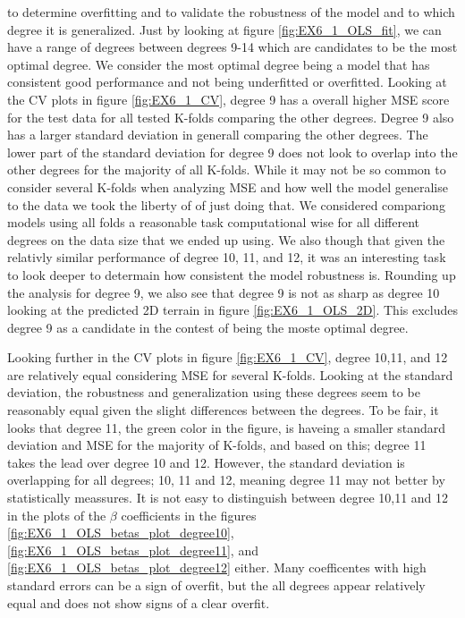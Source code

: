 \documentclass[11pt, a4paper]{article}
\begin{document}
to determine overfitting and to validate the robustness of the model and to which degree it is generalized. Just by looking at figure \ref{fig:EX6_1_OLS_fit}, we can have a range of degrees
between degrees 9-14 which are candidates to be the most optimal degree. We consider the most optimal degree being a model that has consistent good performance and not being underfitted or overfitted.
Looking at the CV plots in figure \ref{fig:EX6_1_CV}, degree 9 has a overall higher MSE score for the test data for all tested K-folds comparing the other degrees. Degree 9 also has a larger standard deviation
in generall comparing the other degrees. The lower part of the standard deviation for degree 9 does not look to overlap into the other degrees for the majority of all K-folds. While it may not be so common
to consider several K-folds when analyzing MSE and how well the model generalise to the data we took the liberty of of just doing that. We considered compariong models using all folds a reasonable task
computational wise for all different degrees on the data size that we ended up using. We also though that given the relativly similar performance of degree 10, 11, and 12, it was an interesting task to
look deeper to determain how consistent the model robustness is. Rounding up the analysis for degree 9, we also see that degree 9 is not as sharp as degree 10 looking at the predicted 2D terrain in figure \ref{fig:EX6_1_OLS_2D}.
This excludes degree 9 as a candidate in the contest of being the moste optimal degree.

Looking further in the CV plots in figure \ref{fig:EX6_1_CV}, degree 10,11, and 12 are relatively equal considering MSE for several K-folds. Looking at the standard deviation,
the robustness and generalization using these degrees seem to be reasonably equal given the slight differences between the degrees. To be fair, it looks that degree 11, the green color in the figure,
is haveing a smaller standard deviation and MSE for the majority of K-folds, and based on this; degree 11 takes the lead over degree 10 and 12. However, the standard deviation is overlapping for all
degrees; 10, 11 and 12, meaning degree 11 may not better by statistically meassures. It is not easy to distinguish between degree 10,11 and 12 in the
plots of the $\beta$ coefficients in the figures \ref{fig:EX6_1_OLS_betas_plot_degree10}, \ref{fig:EX6_1_OLS_betas_plot_degree11}, and \ref{fig:EX6_1_OLS_betas_plot_degree12} either.
Many coefficentes with high standard errors can be a sign of overfit, but the all degrees appear relatively equal and does not show signs of a clear overfit.
\end{document}
